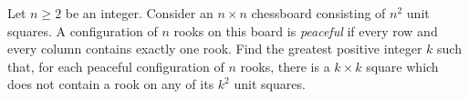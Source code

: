Let $n \ge 2$ be an integer.
Consider an $n \times n$ chessboard consisting of $n^2$ unit squares.
A configuration of $n$ rooks on this board is \emph{peaceful}
if every row and every column contains exactly one rook.
Find the greatest positive integer $k$ such that,
for each peaceful configuration of $n$ rooks,
there is a $k \times k$ square which does not
contain a rook on any of its $k^2$ unit squares.